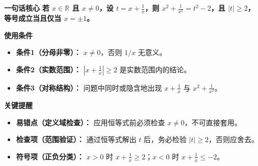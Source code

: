 \begin{summarybox}
	\textbf{\textcolor{CSummary}{一句话核心}}
	\textbf{若 $x\in\mathbb{R}$ 且 $x\neq 0$，设 $t=x+\frac{1}{x}$，则 $x^2+\frac{1}{x^2}=t^2-2$，且 $|t|\ge 2$，等号成立当且仅当 $x=\pm1$。}

	\medskip
	\textbf{\textcolor{CSummary}{使用条件}}
	\begin{itemize}[leftmargin=*, itemsep=0.5em, topsep=0.4em]
		\item \textbf{条件1（分母非零）：} $x\neq 0$，否则 $1/x$ 无意义。
		\item \textbf{条件2（实数范围）：} $\left|x+\frac{1}{x}\right|\ge 2$ 是实数范围内的结论。
		\item \textbf{条件3（对称结构）：} 问题中同时或隐含地出现 $x+\frac{1}{x}$ 与 $x^2+\frac{1}{x^2}$。
	\end{itemize}

	\medskip
	\textbf{\textcolor{CSummary}{关键提醒}}
	\begin{itemize}[leftmargin=*, itemsep=0.5em, topsep=0.4em]
		\item \textbf{易错点（定义域检查）：} 应用恒等式前必须检查 $x\neq 0$，不可直接套用。
		\item \textbf{检查项（范围验证）：} 通过恒等式解出 $t$ 后，务必检验 $|t|\ge 2$，否则应舍去。
		\item \textbf{符号项（正负分类）：} $x>0$ 时 $x+\frac{1}{x}\ge 2$；$x<0$ 时 $x+\frac{1}{x}\le -2$。
	\end{itemize}

\end{summarybox}